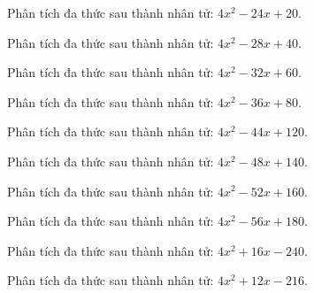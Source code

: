 \begin{bt}
	Phân tích đa thức sau thành nhân tử: $4 x^2 - 24 x + 20$.
\end{bt}
\begin{bt}
	Phân tích đa thức sau thành nhân tử: $4 x^2 - 28 x + 40$.
\end{bt}
\begin{bt}
	Phân tích đa thức sau thành nhân tử: $4 x^2 - 32 x + 60$.
\end{bt}
\begin{bt}
	Phân tích đa thức sau thành nhân tử: $4 x^2 - 36 x + 80$.
\end{bt}
\begin{bt}
	Phân tích đa thức sau thành nhân tử: $4 x^2 - 44 x + 120$.
\end{bt}
\begin{bt}
	Phân tích đa thức sau thành nhân tử: $4 x^2 - 48 x + 140$.
\end{bt}
\begin{bt}
	Phân tích đa thức sau thành nhân tử: $4 x^2 - 52 x + 160$.
\end{bt}
\begin{bt}
	Phân tích đa thức sau thành nhân tử: $4 x^2 - 56 x + 180$.
\end{bt}
\begin{bt}
	Phân tích đa thức sau thành nhân tử: $4 x^2 + 16 x - 240$.
\end{bt}
\begin{bt}
	Phân tích đa thức sau thành nhân tử: $4 x^2 + 12 x - 216$.
\end{bt}
